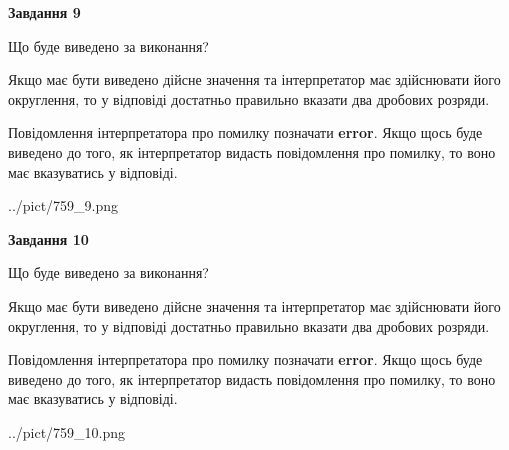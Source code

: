 \documentclass[12pt, ukrainian]{article}
\begin{document}
{\begin {Large}
{\begin {center}\textbf{Завдання 9}\end {center}}\par
Що буде виведено за виконання? \par

Якщо має бути виведено дійсне значення та інтерпретатор має здійснювати його округлення, 
то у відповіді достатньо правильно вказати два дробових розряди.

Повідомлення інтерпретатора про помилку позначати \textbf{error}.
Якщо щось буде виведено до того, як інтерпретатор видасть повідомлення про помилку, 
то воно має вказуватись у відповіді. \par

\begin{center}
	{../pict/759_9.png}
\end{center}
\newpage

{\begin {center}\textbf{Завдання 10}\end {center}}\par
Що буде виведено за виконання? \par

Якщо має бути виведено дійсне значення та інтерпретатор має здійснювати його округлення, 
то у відповіді достатньо правильно вказати два дробових розряди.

Повідомлення інтерпретатора про помилку позначати \textbf{error}.
Якщо щось буде виведено до того, як інтерпретатор видасть повідомлення про помилку, 
то воно має вказуватись у відповіді. \par

\begin{center}
	{../pict/759_10.png}
\end{center}
\newpage

\end {Large}}
\end{document}
